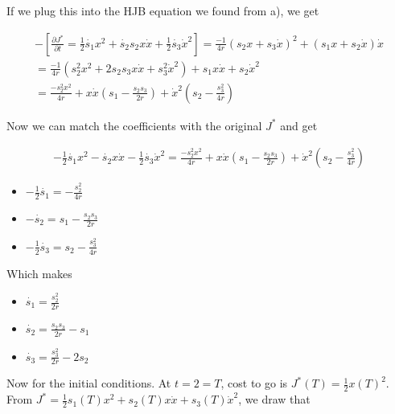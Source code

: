 \documentclass[12pt,A4, onecolumn]{exam}
\begin{document}
\begin{questions}
\begin{question}[10]
\begin{parts}
\begin{solution}
        If we plug this into the HJB equation we found from a), we get

        \begin{align*}
          - \left[ \frac{ \partial J^* }{ \partial t } = \frac{ 1 }{ 2 } \dot{s_1} x^2 + \dot{s_2}s_2 x \dot{x} + \frac{ 1 }{ 2 } \dot{s_3} \dot{x}^2  \right] = \frac{ -1 }{ 4r } \left( s_2x + s_3 \dot{x}  \right) ^2 + \left( s_1x + s_2 \dot{x} \right) \dot{x}  \\
          = \frac{ -1 }{ 4r } \left( s_2^2x^2 + 2s_2s_3 x \dot{x} + s_3^2 \dot{x}^2 \right) + s_1 x \dot{x} + s_2 \dot{x}^2 \\
          = \frac{ -s_2^2 x^2 }{ 4r } + x \dot{x} \left( s_1 - \frac{ s_2 s_3 }{ 2r } \right) + \dot{x}^2 \left( s_2 - \frac{ s_3^2 }{ 4r } \right) 
        \end{align*}

        Now we can match the coefficients with the original $ J^* $ and get 
        
        \begin{align*}
          -\frac{1} {2} \dot{s_1} x^2 - \dot{s_2} x \dot{x} - \frac{ 1 }{ 2 } \dot{s_3} \dot{x}^2 = \frac{ -s_2^2 x^2 }{ 4r } + x \dot{x} \left( s_1 - \frac{ s_2 s_3 }{ 2r } \right) + \dot{x}^2 \left( s_2 - \frac{ s_3^2 }{ 4r } \right)
        \end{align*}

        \begin{itemize}
          \item $ -\frac{1} {2} \dot{s_1} = - \frac{ s_2^2 }{ 4r } $
          \item $ -\dot{s_2} = s_1 - \frac{ s_2s_3 }{ 2r } $  
          \item $ - \frac{ 1 }{ 2 } \dot{s_3} = s_2 - \frac{ s_3^2 }{ 4r } $
        \end{itemize}

        Which makes 

        \begin{itemize}
          \item $ \dot{s_1} = \frac{ s_2^2 }{ 2r } $
          \item $ \dot{s_2} = \frac{ s_2s_3 }{ 2r } - s_1 $
          \item $ \dot{s_3} = \frac{ s_3^2 }{ 2r } - 2s_2 $  
        \end{itemize}
        
        Now for the initial conditions. At $ t=2=T $, cost to go is $ J^*(T)= \frac{ 1 }{ 2 } x(T)^2 $. From $ J^*= \frac{ 1 }{ 2 } s_1(T)x^2 + s_2(T) x \dot{x} + s_3(T) \dot{x}^2 $, we draw that 
        

\end{solution}
\end{parts}
\end{question}
\end{questions}
\end{document}
